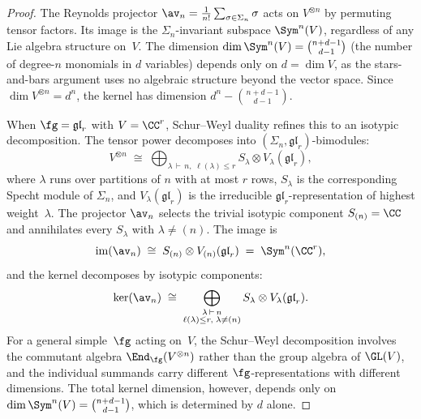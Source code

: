 \begin{proof}
The Reynolds projector
$\av_n = \frac{1}{n!}\sum_{\sigma \in \Sigma_n} \sigma$
acts on $V^{\otimes n}$ by permuting tensor factors.
Its image is the $\Sigma_n$-invariant subspace
$\Sym^n(V)$, regardless of any Lie algebra structure
on~$V$. The dimension
$\dim\Sym^n(V) = \binom{n+d-1}{d-1}$ (the number of
degree-$n$ monomials in $d$ variables) depends only on
$d = \dim V$, as the stars-and-bars argument uses no
algebraic structure beyond the vector space.
Since $\dim V^{\otimes n} = d^n$, the kernel has dimension
$d^n - \binom{n+d-1}{d-1}$.

When $\fg = \mathfrak{gl}_r$ with $V = \CC^r$,
Schur--Weyl duality refines this to an isotypic
decomposition. The tensor power decomposes into
$(\Sigma_n, \mathfrak{gl}_r)$-bimodules:
\begin{equation}\label{eq:schur-weyl-decomp}
 V^{\otimes n}
 \;\cong\;
 \bigoplus_{\lambda \,\vdash\, n,\;
 \ell(\lambda) \leq r}
 S_\lambda \otimes V_\lambda(\mathfrak{gl}_r),
\end{equation}
where $\lambda$ runs over partitions of $n$ with at most
$r$ rows, $S_\lambda$ is the corresponding Specht module
of $\Sigma_n$, and $V_\lambda(\mathfrak{gl}_r)$ is the
irreducible $\mathfrak{gl}_r$-representation of highest
weight~$\lambda$.
The projector $\av_n$ selects the trivial isotypic
component $S_{(n)} = \CC$ and annihilates every
$S_\lambda$ with $\lambda \neq (n)$. The image is
\[
 \operatorname{im}(\av_n)
 \;\cong\;
 S_{(n)} \otimes V_{(n)}(\mathfrak{gl}_r)
 \;=\;
 \Sym^n(\CC^r),
\]
and the kernel decomposes by isotypic components:
\[
 \ker(\av_n)
 \;\cong\;
 \bigoplus_{\substack{\lambda \,\vdash\, n \\
 \ell(\lambda) \leq r,\;
 \lambda \neq (n)}}
 S_\lambda \otimes V_\lambda(\mathfrak{gl}_r).
\]
For a general simple~$\fg$ acting on~$V$, the Schur--Weyl
decomposition involves the commutant algebra
$\End_\fg(V^{\otimes n})$ rather than the group algebra of
$\GL(V)$, and the individual summands carry different
$\fg$-representations with different dimensions.
The total kernel dimension, however, depends only on
$\dim\Sym^n(V) = \binom{n+d-1}{d-1}$, which is
determined by $d$ alone.
\end{proof}

